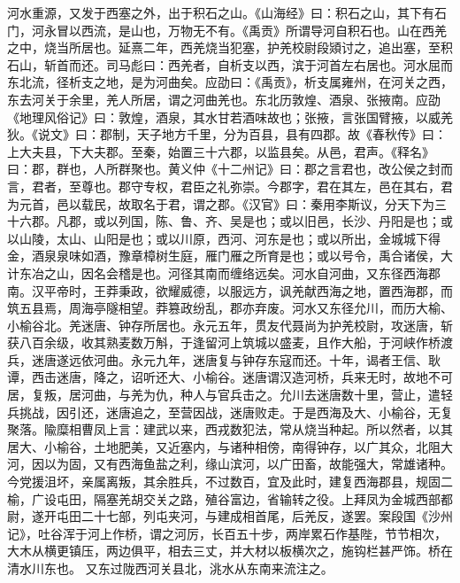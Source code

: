 \documentclass[12pt,UTF8]{ctexbook}
\begin{document}
河水重源，又发于西塞之外，出于积石之山。《山海经》曰：积石之山，其下有石门，河永冒以西流，是山也，万物无不有。《禹贡》所谓导河自积石也。山在西羌之中，烧当所居也。延熹二年，西羌烧当犯塞，护羌校尉段熲讨之，追出塞，至积石山，斩首而还。司马彪曰：西羌者，自析支以西，滨于河首左右居也。河水屈而东北流，径析支之地，是为河曲矣。应劭曰：《禹贡》，析支属雍州，在河关之西，东去河关于余里，羌人所居，谓之河曲羌也。东北历敦煌、酒泉、张掖南。应劭《地理风俗记》曰：敦煌，酒泉，其水甘若酒味故也；张掖，言张国臂掖，以威羌狄。《说文》曰：郡制，天子地方千里，分为百县，县有四郡。故《春秋传》曰：上大夫县，下大夫郡。至秦，始置三十六郡，以监县矣。从邑，君声。《释名》曰：郡，群也，人所群聚也。黄义仲《十二州记》曰：郡之言君也，改公侯之封而言，君者，至尊也。郡守专权，君臣之礼弥崇。今郡字，君在其左，邑在其右，君为元首，邑以载民，故取名于君，谓之郡。《汉官》曰：秦用李斯议，分天下为三十六郡。凡郡，或以列国，陈、鲁、齐、吴是也；或以旧邑，长沙、丹阳是也；或以山陵，太山、山阳是也；或以川原，西河、河东是也；或以所出，金城城下得金，酒泉泉味如酒，豫章樟树生庭，雁门雁之所育是也；或以号令，禹合诸侯，大计东冶之山，因名会稽是也。河径其南而缠络远矣。河水自河曲，又东径西海郡南。汉平帝时，王莽秉政，欲耀威德，以服远方，讽羌献西海之地，置西海郡，而筑五县焉，周海亭隧相望。莽篡政纷乱，郡亦弃废。河水又东径允川，而历大榆、小榆谷北。羌迷唐、钟存所居也。永元五年，贯友代聂尚为护羌校尉，攻迷唐，斩获八百余级，收其熟麦数万斛，于逢留河上筑城以盛麦，且作大船，于河峡作桥渡兵，迷唐遂远依河曲。永元九年，迷唐复与钟存东寇而还。十年，谒者王信、耿谭，西击迷唐，降之，诏听还大、小榆谷。迷唐谓汉造河桥，兵来无时，故地不可居，复叛，居河曲，与羌为仇，种人与官兵击之。允川去迷唐数十里，营止，遣轻兵挑战，因引还，迷唐追之，至营因战，迷唐败走。于是西海及大、小榆谷，无复聚落。隃糜相曹凤上言：建武以来，西戎数犯法，常从烧当种起。所以然者，以其居大、小榆谷，土地肥美，又近塞内，与诸种相傍，南得钟存，以广其众，北阻大河，因以为固，又有西海鱼盐之利，缘山滨河，以广田畜，故能强大，常雄诸种。今党援沮坏，亲属离叛，其余胜兵，不过数百，宜及此时，建复西海郡县，规固二榆，广设屯田，隔塞羌胡交关之路，殖谷富边，省输转之役。上拜凤为金城西部都尉，遂开屯田二十七部，列屯夹河，与建成相首尾，后羌反，遂罢。案段国《沙州记》，吐谷浑于河上作桥，谓之河厉，长百五十步，两岸累石作基陛，节节相次，大木从横更镇压，两边俱平，相去三丈，并大材以板横次之，施钩栏甚严饰。桥在清水川东也。
又东过陇西河关县北，洮水从东南来流注之。
\end{document}
